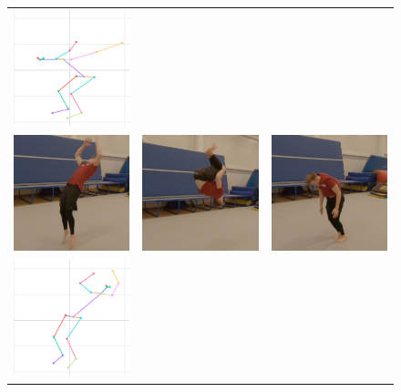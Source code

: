 \begin{figure}
\begin{tabular}{ccc}
\includegraphics[width=5cm]{images/data-preprocessing/centered-backflip-skel-part-3}\\
\includegraphics[width=5cm]{images/data-preprocessing/centered-backflip-orig-part-4}&
\includegraphics[width=5cm]{images/data-preprocessing/centered-backflip-orig-part-5}&
\includegraphics[width=5cm]{images/data-preprocessing/centered-backflip-orig-part-6}\\
\includegraphics[width=5cm]{images/data-preprocessing/centered-backflip-skel-part-4}&

\end{tabular}
\end{figure}
